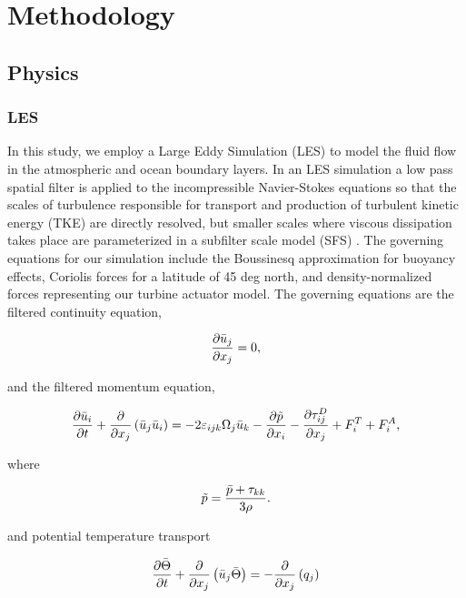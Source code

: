 \section{Methodology}

\subsection{Physics}


\subsubsection{LES}
In this study, we employ a Large Eddy Simulation (LES) to model the fluid flow in the atmospheric and ocean boundary layers.  In an LES simulation a low pass spatial filter is applied to the incompressible Navier-Stokes equations so that the scales of turbulence responsible for transport and production of turbulent kinetic energy (TKE) are directly resolved, but smaller scales where viscous dissipation takes place are parameterized in a subfilter scale model (SFS) \cite{moeng_large-eddy-simulation_1984}.  The governing equations for our simulation include the Boussinesq approximation for buoyancy effects, Coriolis forces for a latitude of 45 deg north, and density-normalized forces representing our turbine actuator model.  The governing equations are the filtered continuity equation,

\begin{equation}
   \label{filtered_continuity}
   \frac{\partial \bar{u}_j}{\partial x_j} = 0,
\end{equation}

and the filtered momentum equation,

\begin{equation}
   \label{filtered_momentum}
   \frac{\partial \bar{u}_i}{\partial t} + \frac{\partial}{\partial x_j}\left(\bar{u}_j \bar{u}_i \right)
   = -2\varepsilon_{ijk}\Omega_{j} \bar{u}_k -\frac{\partial \tilde{p}}{\partial x_i} - \frac{\partial \tau^D_{ij}}{\partial x_j} + F^T_i + F^A_i,
\end{equation}

where

\begin{equation}
   \label{eq:modified_pressure}
   \tilde{p} = \frac{\bar{p} + \tau_{kk}}{3 \rho}.
\end{equation}

and potential temperature transport

\begin{equation}
   \label{potential temp}
   \frac{\partial \bar{\Theta}}{\partial t} + \frac{\partial}{\partial x_j}\left(\bar{u}_j \bar{\Theta} \right)
   = - \frac{\partial}{\partial x_j}\left( q_j\right) 
\end{equation}

